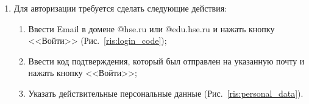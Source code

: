 \documentclass{../includes/TechDoc}
\begin{document}
\begin{enumerate}
        \newpage
        \item Для авторизации требуется сделать следующие действия:
        \begin{enumerate}
            \item Ввести Email в домене @hse.ru или @edu.hse.ru и нажать кнопку <<Войти>> (Рис.~\ref{ris:login_code});
            \item Ввести код подтверждения, который был отправлен на указанную почту и нажать кнопку <<Войти>>;
            \item Указать действительные персональные данные (Рис.~\ref{ris:personal_data}).
        \end{enumerate}
        \begin{figure}[h]
            \begin{center}
                \begin{minipage}[ht]{0.4\linewidth}

\end{minipage}
\end{center}
\end{figure}
\end{enumerate}
\end{document}
